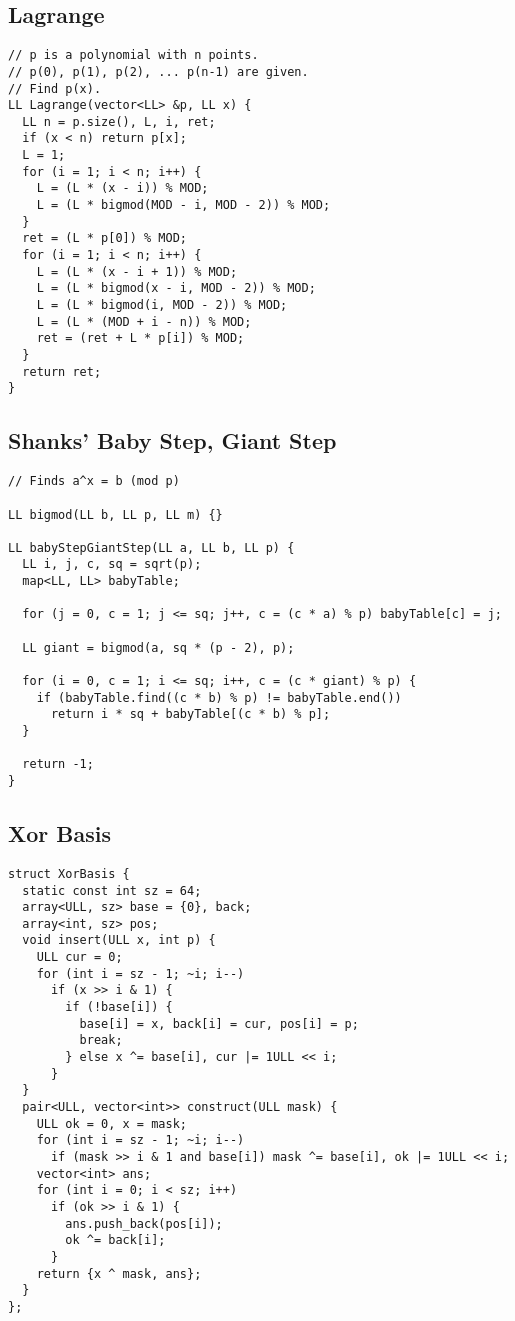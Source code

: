 \documentclass[FSZ,a4paper,onesided]{article}
\begin{document}
\begin{multicols*}{\COLS}
\begin{lstlisting}
\end{lstlisting}
\subsection{Lagrange}
\begin{lstlisting}
// p is a polynomial with n points.
// p(0), p(1), p(2), ... p(n-1) are given.
// Find p(x).
LL Lagrange(vector<LL> &p, LL x) {
  LL n = p.size(), L, i, ret;
  if (x < n) return p[x];
  L = 1;
  for (i = 1; i < n; i++) {
    L = (L * (x - i)) % MOD;
    L = (L * bigmod(MOD - i, MOD - 2)) % MOD;
  }
  ret = (L * p[0]) % MOD;
  for (i = 1; i < n; i++) {
    L = (L * (x - i + 1)) % MOD;
    L = (L * bigmod(x - i, MOD - 2)) % MOD;
    L = (L * bigmod(i, MOD - 2)) % MOD;
    L = (L * (MOD + i - n)) % MOD;
    ret = (ret + L * p[i]) % MOD;
  }
  return ret;
}
\end{lstlisting}
\subsection{Shanks' Baby Step, Giant Step}
\begin{lstlisting}
// Finds a^x = b (mod p)

LL bigmod(LL b, LL p, LL m) {}

LL babyStepGiantStep(LL a, LL b, LL p) {
  LL i, j, c, sq = sqrt(p);
  map<LL, LL> babyTable;

  for (j = 0, c = 1; j <= sq; j++, c = (c * a) % p) babyTable[c] = j;

  LL giant = bigmod(a, sq * (p - 2), p);

  for (i = 0, c = 1; i <= sq; i++, c = (c * giant) % p) {
    if (babyTable.find((c * b) % p) != babyTable.end())
      return i * sq + babyTable[(c * b) % p];
  }

  return -1;
}
\end{lstlisting}
\subsection{Xor Basis}
\begin{lstlisting}
struct XorBasis {
  static const int sz = 64;
  array<ULL, sz> base = {0}, back;
  array<int, sz> pos;
  void insert(ULL x, int p) {
    ULL cur = 0;
    for (int i = sz - 1; ~i; i--)
      if (x >> i & 1) {
        if (!base[i]) {
          base[i] = x, back[i] = cur, pos[i] = p;
          break;
        } else x ^= base[i], cur |= 1ULL << i;
      }
  }
  pair<ULL, vector<int>> construct(ULL mask) {
    ULL ok = 0, x = mask;
    for (int i = sz - 1; ~i; i--)
      if (mask >> i & 1 and base[i]) mask ^= base[i], ok |= 1ULL << i;
    vector<int> ans;
    for (int i = 0; i < sz; i++)
      if (ok >> i & 1) {
        ans.push_back(pos[i]);
        ok ^= back[i];
      }
    return {x ^ mask, ans};
  }
};
\end{lstlisting}

\end{multicols*}
\end{document}
